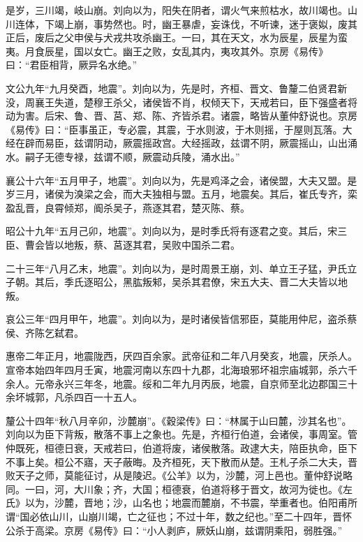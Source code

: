 \documentclass[12pt,UTF8]{ctexbook}
\begin{document}
是岁，三川竭，岐山崩。刘向以为，阳失在阴者，谓火气来煎枯水，故川竭也。山川连体，下竭上崩，事势然也。时，幽王暴虐，妄诛伐，不听谏，迷于褒姒，废其正后，废后之父申侯与犬戎共攻杀幽王。一曰，其在天文，水为辰星，辰星为蛮夷。月食辰星，国以女亡。幽王之败，女乱其内，夷攻其外。京房《易传》曰：“君臣相背，厥异名水绝。”



文公九年“九月癸酉，地震”。刘向以为，先是时，齐桓、晋文、鲁釐二伯贤君新没，周襄王失道，楚穆王杀父，诸侯皆不肖，权倾天下，天戒若曰，臣下强盛者将动为害。后宋、鲁、晋、莒、郑、陈、齐皆杀君。诸震，略皆从董仲舒说也。京房《易传》曰：“臣事虽正，专必震，其震，于水则波，于木则摇，于屋则瓦落。大经在辟而易臣，兹谓阴动，厥震摇政宫。大经摇政，兹谓不阴，厥震摇山，山出涌水。嗣子无德专禄，兹谓不顺，厥震动兵陵，涌水出。”



襄公十六年“五月甲子，地震”。刘向以为，先是鸡泽之会，诸侯盟，大夫又盟。是岁三月，诸侯为溴梁之会，而大夫独相与盟。五月，地震矣。其后，崔氏专齐，栾盈乱晋，良霄倾郑，阍杀吴子，燕逐其君，楚灭陈、蔡。



昭公十九年“五月己卯，地震”。刘向以为，是时季氏将有逐君之变。其后，宋三臣、曹会皆以地叛，蔡、莒逐其君，吴败中国杀二君。



二十三年“八月乙末，地震”。刘向以为，是时周景王崩，刘、单立王子猛，尹氏立子朝。其后，季氏逐昭公，黑肱叛邾，吴杀其君僚，宋五大夫、晋二大夫皆以地叛。



哀公三年“四月甲午，地震”。刘向以为，是时诸侯皆信邪臣，莫能用仲尼，盗杀蔡侯、齐陈乞弑君。



惠帝二年正月，地震陇西，厌四百余家。武帝征和二年八月癸亥，地震，厌杀人。宣帝本始四年四月壬寅，地震河南以东四十九郡，北海琅邪坏祖宗庙城郭，杀六千余人。元帝永兴三年冬，地震。绥和二年九月丙辰，地震，自京师至北边郡国三十余坏城郭，凡杀四百一十五人。



釐公十四年“秋八月辛卯，沙麓崩”。《穀梁传》曰：“林属于山曰麓，沙其名也”。刘向以为臣下背叛，散落不事上之象也。先是，齐桓行伯道，会诸侯，事周室。管仲既死，桓德日衰，天戒若曰，伯道将废，诸侯散落。政逮大夫，陪臣执命，臣下不事上矣。桓公不寤，天子蔽晦。及齐桓死，天下散而从楚。王札子杀二大夫，晋败天子之师，莫能征讨，从是陵迟。《公羊》以为，沙麓，河上邑也。董仲舒说略同。一曰，河，大川象；齐，大国；桓德衰，伯道将移于晋文，故河为徙也。《左氏》以为，沙麓，晋地；沙，山名也；地震而麓崩，不书震，举重者也。伯阳甫所谓“国必依山川，山崩川竭，亡之征也；不过十年，数之纪也。”至二十四年，晋怀公杀于高梁。京房《易传》曰：“小人剥庐，厥妖山崩，兹谓阴乘阳，弱胜强。”
\end{document}
